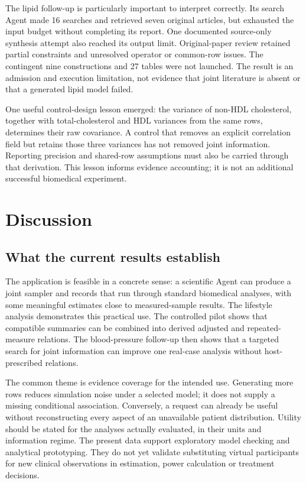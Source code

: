 \documentclass[11pt,letterpaper]{article}
\begin{document}
\endgroup

The lipid follow-up is particularly important to interpret correctly. Its search Agent made 16 searches and retrieved seven original articles, but exhausted the input budget without completing its report. One documented source-only synthesis attempt also reached its output limit. Original-paper review retained partial constraints and unresolved operator or common-row issues. The contingent nine constructions and 27 tables were not launched. The result is an admission and execution limitation, not evidence that joint literature is absent or that a generated lipid model failed.


One useful control-design lesson emerged: the variance of non-HDL cholesterol, together with total-cholesterol and HDL variances from the same rows, determines their raw covariance. A control that removes an explicit correlation field but retains those three variances has not removed joint information. Reporting precision and shared-row assumptions must also be carried through that derivation. This lesson informs evidence accounting; it is not an additional successful biomedical experiment.



\section{Discussion}

\subsection{What the current results establish}

The application is feasible in a concrete sense: a scientific Agent can produce a joint sampler and records that run through standard biomedical analyses, with some meaningful estimates close to measured-sample results. The lifestyle analysis demonstrates this practical use. The controlled pilot shows that compatible summaries can be combined into derived adjusted and repeated-measure relations. The blood-pressure follow-up then shows that a targeted search for joint information can improve one real-case analysis without host-prescribed relations.


The common theme is evidence coverage for the intended use. Generating more rows reduces simulation noise under a selected model; it does not supply a missing conditional association. Conversely, a request can already be useful without reconstructing every aspect of an unavailable patient distribution. Utility should be stated for the analyses actually evaluated, in their units and information regime. The present data support exploratory model checking and analytical prototyping. They do not yet validate substituting virtual participants for new clinical observations in estimation, power calculation or treatment decisions.
\end{document}
